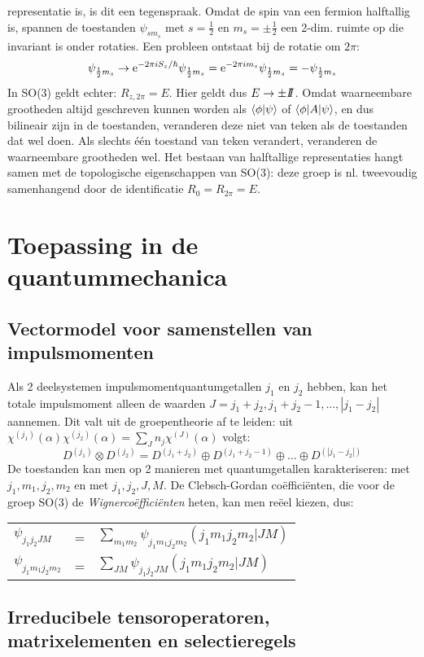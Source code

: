 representatie is, is dit een tegenspraak.
\npar
Omdat de spin van een fermion halftallig is, spannen de toestanden $\psi_{sm_s}$
met $s=\frac{1}{2}$ en $m_s=\pm\frac{1}{2}$ een 2-dim. ruimte op die invariant
is onder rotaties. Een probleen ontstaat bij de rotatie om $2\pi$:
\[
\psi_{\frac{1}{2}m_s}\rightarrow{\rm e}^{-2\pi iS_z/\hbar}\psi_{\frac{1}{2}m_s}
={\rm e}^{-2\pi im_s}\psi_{\frac{1}{2}m_s}=-\psi_{\frac{1}{2}m_s}
\]
In SO(3) geldt echter: $R_{z,2\pi}=E$. Hier geldt dus $E\rightarrow\pm I\hspace{-0.8ex}I$.
Omdat waarneembare grootheden altijd geschreven kunnen worden als
$\left\langle \phi|\psi \right\rangle$ of $\left\langle \phi|A|\psi \right\rangle$, en dus bilineair zijn in de
toestanden, veranderen deze niet van teken als de toestanden dat wel doen.
Als slechts \'e\'en toestand van teken verandert, veranderen de waarneembare
grootheden wel.
\npar
Het bestaan van halftallige representaties hangt samen met de topologische
eigenschappen van SO(3): deze groep is nl. tweevoudig samenhangend door de
identificatie $R_0=R_{2\pi}=E$.

\section{Toepassing in de quantummechanica}
\subsection{Vectormodel voor samenstellen van impulsmomenten}
Als 2 deelsystemen impulsmomentquantumgetallen $j_1$ en $j_2$ hebben, kan het
totale impulsmoment alleen de waarden $J=j_1+j_2,j_1+j_2-1,...,|j_1-j_2|$
aannemen. Dit valt uit de groepentheorie af te leiden: uit
$\chi^{(j_1)}(\alpha)\chi^{(j_2)}(\alpha)=\sum\limits_{J}n_j\chi^{(J)}(\alpha)$
volgt:
\[
D^{(j_1)}\otimes D^{(j_2)}=D^{(j_1+j_2)}\oplus D^{(j_1+j_2-1)}\oplus...\oplus D^{(|j_1-j_2|)}
\]
De toestanden kan men op 2 manieren met quantumgetallen karakteriseren: met
$j_1,m_1,j_2,m_2$ en met $j_1,j_2,J,M$. De Clebsch-Gordan co\"effici\"enten, die
voor de groep SO(3) de {\it Wignerco\"effici\"enten} heten, kan men re\"eel kiezen,
dus:
\begin{tabular}[t]{lcl}
$\psi_{j_1j_2JM}$    &=&$\sum\limits_{m_1m_2}\psi_{j_1m_1j_2m_2}(j_1m_1j_2m_2|JM)$\\
$\psi_{j_1m_1j_2m_2}$&=&$\sum\limits_{JM}\psi_{j_1j_2JM}(j_1m_1j_2m_2|JM)$\\
\end{tabular}

\subsection{Irreducibele tensoroperatoren, matrixelementen en selectieregels}
